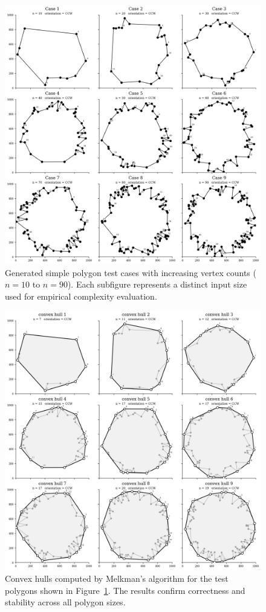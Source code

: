 \documentclass{article}
\begin{document}
\begin{figure}[H]
    \centering
    \includegraphics[width=0.95\linewidth]{Pictures/test_polygon_cases.png}
    \caption{Generated simple polygon test cases with increasing vertex counts ($n=10$ to $n=90$). 
    Each subfigure represents a distinct input size used for empirical complexity evaluation.}
    \label{fig:testpolys}
\end{figure}

\begin{figure}[H]
    \centering
    \includegraphics[width=0.95\linewidth]{Pictures/test_hulls.png}
    \caption{Convex hulls computed by Melkman’s algorithm for the test polygons shown in Figure~\ref{fig:testpolys}. 
    The results confirm correctness and stability across all polygon sizes.}
    \label{fig:testhulls}
\end{figure}
\end{document}
